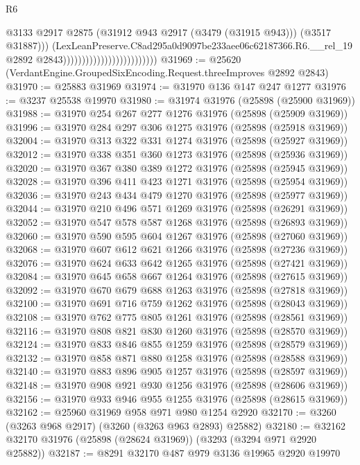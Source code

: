 \begin{lexlean}{R6}
\begin{coremodule}
                                                        @3133
                                                        @2917
                                                        @2875
                                                        (@31912 @943 @2917 (@3479 (@31915 @943)))
                                                        (@3517 @31887)))
                                                    (LexLeanPreserve.C8ad295a0d9097be233aee06c62187366.R6.__rel_19
                                                      @2892
                                                      @2843)))))))))))))))))))))))))
@31969 := @25620 (VerdantEngine.GroupedSixEncoding.Request.threeImproves @2892 @2843)
@31970 := @25883 @31969
@31974 := @31970 @136 @147 @247 @1277
@31976 := @3237 @25538 @19970
@31980 := @31974 @31976 (@25898 (@25900 @31969))
@31988 := @31970 @254 @267 @277 @1276 @31976 (@25898 (@25909 @31969))
@31996 := @31970 @284 @297 @306 @1275 @31976 (@25898 (@25918 @31969))
@32004 := @31970 @313 @322 @331 @1274 @31976 (@25898 (@25927 @31969))
@32012 := @31970 @338 @351 @360 @1273 @31976 (@25898 (@25936 @31969))
@32020 := @31970 @367 @380 @389 @1272 @31976 (@25898 (@25945 @31969))
@32028 := @31970 @396 @411 @423 @1271 @31976 (@25898 (@25954 @31969))
@32036 := @31970 @243 @434 @479 @1270 @31976 (@25898 (@25977 @31969))
@32044 := @31970 @210 @496 @571 @1269 @31976 (@25898 (@26291 @31969))
@32052 := @31970 @547 @578 @587 @1268 @31976 (@25898 (@26893 @31969))
@32060 := @31970 @590 @595 @604 @1267 @31976 (@25898 (@27060 @31969))
@32068 := @31970 @607 @612 @621 @1266 @31976 (@25898 (@27236 @31969))
@32076 := @31970 @624 @633 @642 @1265 @31976 (@25898 (@27421 @31969))
@32084 := @31970 @645 @658 @667 @1264 @31976 (@25898 (@27615 @31969))
@32092 := @31970 @670 @679 @688 @1263 @31976 (@25898 (@27818 @31969))
@32100 := @31970 @691 @716 @759 @1262 @31976 (@25898 (@28043 @31969))
@32108 := @31970 @762 @775 @805 @1261 @31976 (@25898 (@28561 @31969))
@32116 := @31970 @808 @821 @830 @1260 @31976 (@25898 (@28570 @31969))
@32124 := @31970 @833 @846 @855 @1259 @31976 (@25898 (@28579 @31969))
@32132 := @31970 @858 @871 @880 @1258 @31976 (@25898 (@28588 @31969))
@32140 := @31970 @883 @896 @905 @1257 @31976 (@25898 (@28597 @31969))
@32148 := @31970 @908 @921 @930 @1256 @31976 (@25898 (@28606 @31969))
@32156 := @31970 @933 @946 @955 @1255 @31976 (@25898 (@28615 @31969))
@32162 := @25960 @31969 @958 @971 @980 @1254 @2920
@32170 := @3260 (@3263 @968 @2917) (@3260 (@3263 @963 @2893) @25882)
@32180 := @32162 @32170 @31976 (@25898 (@28624 @31969)) (@3293 (@3294 @971 @2920 @25882))
@32187 := @8291 @32170 @487 @979 @3136 @19965 @2920 @19970

\end{coremodule}
\end{lexlean}
